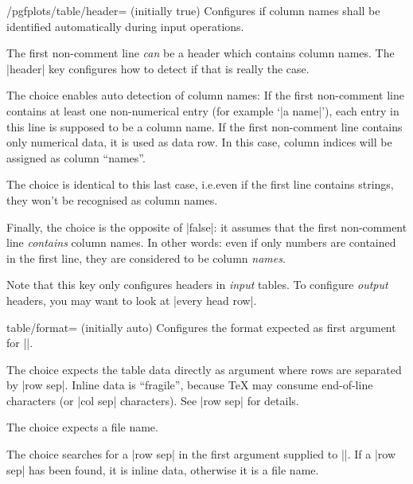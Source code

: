 \documentclass[a4paper]{ltxdoc}
\begin{document}
\begin{key}{/pgfplots/table/header= (initially true)}
    Configures if column names shall be identified automatically during input
    operations.

    The first non-comment line \emph{can} be a header which contains column
    names. The |header| key configures how to detect if that is really the
    case.

    The choice  enables auto detection of column names: If
    the first non-comment line contains at least one non-numerical entry (for
    example `|a name|'), each entry in this line is supposed to be a column
    name. If the first non-comment line contains only numerical data, it is
    used as data row. In this case, column indices will be assigned as column
    ``names''.

    The choice  is identical to this last case, i.e.\@ even
    if the first line contains strings, they won't be recognised as column
    names.

    Finally, the choice  is the opposite of |false|:
    it assumes that the first non-comment line \emph{contains} column names.
    In other words: even if only numbers are contained in the first line, they
    are considered to be column \emph{names}.

    Note that this key only configures headers in \emph{input} tables. To
    configure \emph{output} headers, you may want to look at |every head row|.
\end{key}

\begin{pgfplotskey}{table/format= (initially auto)}
    Configures the format expected as first argument for
    |\pgfplotstableread|.

    The choice  expects the table data directly as argument
    where rows are separated by |row sep|. Inline data is ``fragile'', because
    \TeX{} may consume end-of-line characters (or |col sep| characters). See
    |row sep| for details.

    The choice  expects a file name.

    The choice  searches for a |row sep| in the first
    argument supplied to |\pgfplotstableread|. If a |row sep| has been found,
    it is inline data, otherwise it is a file name.
\end{pgfplotskey}
\end{document}
